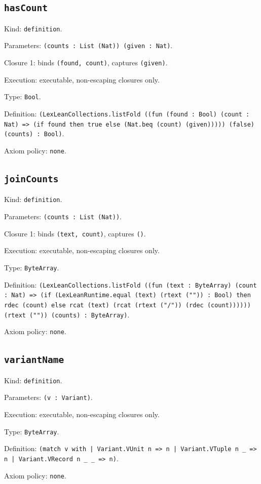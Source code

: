 \documentclass[11pt]{article}
\begin{document}
\subsection*{\texttt{hasCount}}
\noindent Kind: \texttt{definition}.\par
\noindent Parameters: \texttt{(counts : List (Nat)) (given : Nat)}.\par
\noindent Closure 1: binds \texttt{(found, count)}, captures \texttt{(given)}.\par
\noindent Execution: executable, non-escaping closures only.\par
\noindent Type: \texttt{Bool}.\par
\noindent Definition: \texttt{(LexLeanCollections.listFold ((fun (found : Bool) (count : Nat) => (if found then true else (Nat.beq (count) (given))))) (false) (counts) : Bool)}.\par
\noindent Axiom policy: \texttt{none}.\par
\subsection*{\texttt{joinCounts}}
\noindent Kind: \texttt{definition}.\par
\noindent Parameters: \texttt{(counts : List (Nat))}.\par
\noindent Closure 1: binds \texttt{(text, count)}, captures \texttt{()}.\par
\noindent Execution: executable, non-escaping closures only.\par
\noindent Type: \texttt{ByteArray}.\par
\noindent Definition: \texttt{(LexLeanCollections.listFold ((fun (text : ByteArray) (count : Nat) => (if (LexLeanRuntime.equal (text) (rtext ("")) : Bool) then rdec (count) else rcat (text) (rcat (rtext ("/")) (rdec (count)))))) (rtext ("")) (counts) : ByteArray)}.\par
\noindent Axiom policy: \texttt{none}.\par
\subsection*{\texttt{variantName}}
\noindent Kind: \texttt{definition}.\par
\noindent Parameters: \texttt{(v : Variant)}.\par
\noindent Execution: executable, non-escaping closures only.\par
\noindent Type: \texttt{ByteArray}.\par
\noindent Definition: \texttt{(match v with | Variant.VUnit n => n | Variant.VTuple n \_ => n | Variant.VRecord n \_ \_ => n)}.\par
\noindent Axiom policy: \texttt{none}.\par
\end{document}
